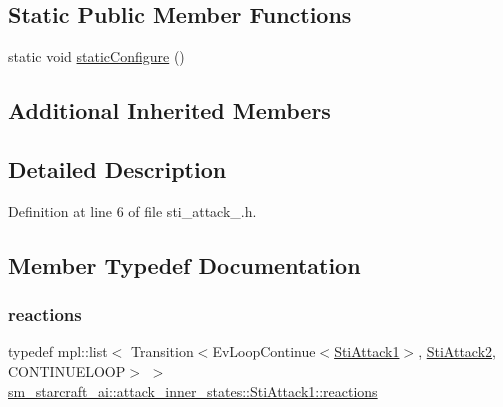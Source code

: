 \subsection*{Static Public Member Functions}
\begin{DoxyCompactItemize}
\item 
static void \hyperlink{structsm__starcraft__ai_1_1attack__inner__states_1_1StiAttack1_a880c622e62d84a29d09c4c0e7e8f4e69}{static\+Configure} ()
\end{DoxyCompactItemize}
\subsection*{Additional Inherited Members}


\subsection{Detailed Description}


Definition at line 6 of file sti\+\_\+attack\+\_.\+h.



\subsection{Member Typedef Documentation}
\mbox{\label{structsm__starcraft__ai_1_1attack__inner__states_1_1StiAttack1_a0aff5f8d7ce463d461248ff39f0265ea}} 
\subsubsection{\texorpdfstring{reactions}{reactions}}
{\footnotesize\ttfamily typedef mpl\+::list$<$ Transition$<$Ev\+Loop\+Continue$<$\hyperlink{structsm__starcraft__ai_1_1attack__inner__states_1_1StiAttack1}{Sti\+Attack1}$>$, \hyperlink{structsm__starcraft__ai_1_1attack__inner__states_1_1StiAttack2}{Sti\+Attack2}, C\+O\+N\+T\+I\+N\+U\+E\+L\+O\+OP$>$ $>$ \hyperlink{structsm__starcraft__ai_1_1attack__inner__states_1_1StiAttack1_a0aff5f8d7ce463d461248ff39f0265ea}{sm\+\_\+starcraft\+\_\+ai\+::attack\+\_\+inner\+\_\+states\+::\+Sti\+Attack1\+::reactions}}



